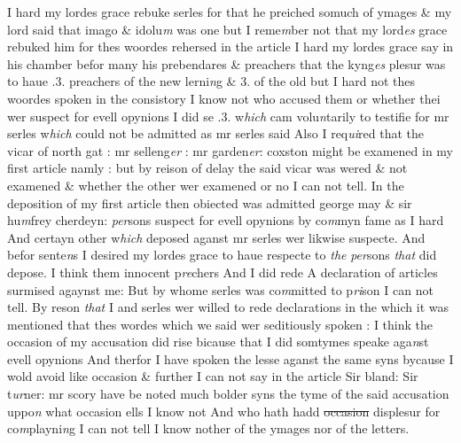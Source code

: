 \documentclass[12pt, a4paper]{book}
\begin{document}
				\marginpar[\vspace{0.5cm}{\textcolor{Gray}{4.}}]{}
			 I hard my lordes grace rebuke serles for that he preiched somuch of ymages \& my lord said that imago \& idolu\textit{m} was one but I  reme\textit{m}ber not that my lord\textit{es} grace rebuked him for thes woordes  rehersed in the article 
				\marginpar[\vspace{0.5cm}{\textcolor{Gray}{5.}}]{}
			 I hard my lordes grace say in his chamber befor many his prebendares \& preachers that the kyng\textit{es} plesur was to haue .3. preachers of the new lerni\textit{n}g \& 3. of the old but I hard not thes woordes spoken in the consistory 
				\marginpar[\vspace{0.5cm}{\textcolor{Gray}{6.}}]{}
			 I know not who accused them or whether thei wer suspect for evell opynions 
				\marginpar[\vspace{0.5cm}{\textcolor{Gray}{7.}}]{}
			 I did se .3. w\textit{hich} cam volu\textit{n}tarily to testifie for mr serles w\textit{hich} could not  be admitted as mr serles said Also I req\textit{ui}red that the vicar of north gat : mr selleng\textit{er} : mr garden\textit{er}: coxston might be examened in my first article namly : but by reison of delay the said vicar was  wered \& not examened \& whether the other wer examened or no  I can not tell. 
				\marginpar[\vspace{0.5cm}{\textcolor{Gray}{8.}}]{}
			 In the deposition of my first article then obiected was admitted  george may \& sir hu\textit{m}frey cherdeyn: \textit{per}sons suspect for evell opynions by co\textit{m}myn fame as I hard And certayn other w\textit{hich} deposed aganst mr serles wer likwise suspecte. And befor sente\textit{n}s I desired my lordes grace to haue respecte to \textit{the}
               \textit{per}sons \textit{that} did depose. 
				\marginpar[\vspace{0.5cm}{\textcolor{Gray}{9.}}]{}
			 I think them innocent p\textit{re}chers And I did rede A declaration of articles surmised agaynst me: But by whome serles was  co\textit{m}mitted to p\textit{ri}son I can not tell.  
				\marginpar[\vspace{0.5cm}{\textcolor{Gray}{10.}}]{}
			 By reson \textit{that} I and serles wer willed to rede declarations in the which it was mentioned that thes wordes which we said wer seditiously spoken : I think the occasion of my  accusation did rise bicause that I did somtymes speake aga\textit{n}st evell opynions And therfor I have spoken the lesse aganst the same syns bycause I wold avoid like occasion \& further I can not say in the article 
				\marginpar[\vspace{0.5cm}{\textcolor{Gray}{11.}}]{}
			 Sir bland: Sir t\textit{ur}ner: mr scory have be noted much bolder syns the tyme of the said accusation uppo\textit{n} what occasion ells I know  not And who hath hadd \sout{occasion} displesur for co\textit{m}playni\textit{n}g I can not tell 
				\marginpar[\vspace{0.5cm}{\textcolor{Gray}{12.}}]{}
			 I know nother of the ymages nor of the letters.
\end{document}
